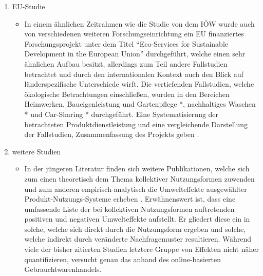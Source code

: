 \documentclass[11pt, titlepage=true]{scrartcl} %
\begin{document}
\begin{enumerate}
     \item EU-Studie
       \begin{itemize}
         \item In einem ähnlichen Zeitrahmen wie die Studie von dem IÖW wurde
           auch von verschiedenen weiteren
           Forschungseinrichtung ein EU finanziertes Forschungsprojekt
           unter dem Titel \enquote{Eco-Services for Sustainable Development in
           the European Union} durchgeführt, welche einen sehr ähnlichen Aufbau
           besitzt, allerdings zum Teil andere Fallstudien betrachtet und durch
           den internationalen Kontext auch den Blick auf länderspezifische
           Unterschiede wirft. 
           Die vertiefenden Fallstudien, welche ökologische Betrachtungen
           einschließen, wurden in den  Bereichen Heimwerken, Baueigenleistung
           und Gartenpflege \cite{behrendt_oko-rent_2000}*, nachhaltiges
           Waschen \cite{behrendt_nachhaltig_2000}* und
           Car-Sharing \cite{behrendt_car-sharing_2000}* durchgeführt. Eine
           Systematisierung der betrachteten Produktdienstleistung und eine
           vergleichende Darstellung der Fallstudien, Zusammenfassung des
           Projekts geben \textcite{behrendt_eco-service_2003}.
       \end{itemize}
     \item weitere Studien
       \begin{itemize}
         \item In der jüngeren Literatur finden sich weitere Publikationen,
           welche sich zum einen theoretisch dem Thema kollektiver
           Nutzungsformen zuwenden
           \parencites{scholl_marketing_2009}{scholl_nutzen_2012} und zum
           anderen empirisch-analytisch die Umwelteffekte ausgewählter
           Produkt-Nutzungs-Systeme
           erheben
           \parencites{rabelt_nachhaltiger_2007}{erdmann_quantifizierung_2011}.
           Erwähnenswert ist, dass \textcite{scholl_marketing_2009} eine
           umfassende Liste der bei kollektiven Nutzungsformen 
           auftretenden positiven und negativen Umwelteffekte aufstellt. Er
           gliedert diese ein in solche, welche sich direkt durch die
           Nutzungsform ergeben und solche, welche indirekt durch veränderte
           Nachfragemuster resultieren.
           Während viele der bisher zitierten Studien letztere Gruppe von
           Effekten nicht
           näher quantifizieren, versucht
           \textcite{erdmann_quantifizierung_2011}  genau das anhand des
           online-basierten Gebrauchtwarenhandels.

\end{itemize}
\end{enumerate}
\end{document}

